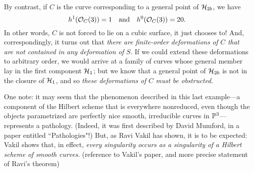 By contrast, if $C$ is the curve corresponding to a general point of ${\cal H}_{2b}$, we have
$$
h^1({\mathcal O}_C(3)) = 1 \quad \text{and} \quad h^0({\mathcal O}_C(3)) = 20.
$$
In other words, $C$ is not forced to lie on a cubic surface, it just chooses to! And, correspondingly, it turns out that \emph{there are finite-order deformations of $C$ that are not contained in any deformation of $S$}. If we could extend these deformations to arbitrary order, we would arrive at a family of curves whose general member lay in the first component ${\cal H}_1$; but we know that a general point of ${\cal H}_{2b}$ is not in the closure of ${\cal H}_1$, and so \emph{these deformations of $C$ must be obstructed}.

One note: it may seem that the phenomenon described in this last example---a component of the Hilbert scheme that is everywhere nonreduced, even though the objects parametrized are perfectly nice smooth, irreducible curves in ${\mathbb P}^3$---represents a pathology. (Indeed, it was first described by David Mumford, in a paper entitled ``Pathologies"!) But, as Ravi Vakil has shown, it is to be expected: Vakil shows that, in effect, \emph{every singularity occurs as a singularity of a Hilbert scheme of smooth curves}. (reference to Vakil's paper, and more precise statement of Ravi's theorem)
 
